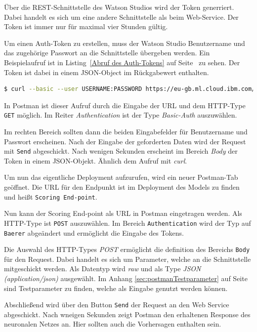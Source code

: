 Über die REST-Schnittstelle des Watson Studios wird der Token generriert. Dabei handelt es sich um eine andere
Schnittstelle als beim Web-Service. Der Token ist immer nur für maximal vier Stunden gültig.

Um einen Auth-Token zu erstellen, muss der Watson Studio Benutzername und das zugehörige Passwort an die Schnittstelle
übergeben werden. Ein Beispielaufruf ist in Listing~\ref{Abruf des Auth-Tokens} auf Seite~\pageref{Abruf des Auth-Tokens}
zu sehen. Der Token ist dabei in einem JSON-Object im Rückgabewert enthalten.

\begin{lstlisting}[language=bash, caption=Abruf des Auth-Tokens, label=Abruf des Auth-Tokens]
$ curl --basic --user USERNAME:PASSWORD https://eu-gb.ml.cloud.ibm.com/v3/identity/token
\end{lstlisting}

In Postman ist dieser Aufruf durch die Eingabe der URL und dem HTTP-Type \texttt{GET} möglich. Im Reiter
\textit{Authentication} ist der Type \textit{Basic-Auth} auszuwählen.

Im rechten Bereich sollten dann die beiden Eingabefelder für Benutzername und Passwort erscheinen. Nach der Eingabe der
geforderten Daten wird der Request mit \texttt{Send} abgeschickt. Nach wenigen Sekunden erscheint im Bereich
\textit{Body} der Token in einem JSON-Objekt. Ähnlich dem Aufruf mit \textit{curl}.

Um nun das eigentliche Deployment aufzurufen, wird ein neuer Postman-Tab geöffnet. Die URL für den Endpunkt ist im
Deployment des Models zu finden und heißt \texttt{Scoring End-point}.

Nun kann der Scoring End-point als URL in Postman eingetragen werden. Als HTTP-Type ist \texttt{POST} auszuwählen.
Im Bereich \texttt{Authentication} wird der Typ auf \texttt{Baerer} abgeändert und ermöglicht die Eingabe des Tokens.

Die Auswahl des HTTP-Types \textit{POST} ermöglicht die definition des Bereichs \texttt{Body} für den Request. Dabei
handelt es sich um Parameter, welche an die Schnittstelle mitgeschickt werden. Als Datentyp wird \textit{raw} und als
Type \textit{JSON (application/json)} ausgewählt. Im Anhang \ref{sec:postmanTestparameter} auf Seite
\pageref{sec:postmanTestparameter} sind Testparameter zu finden, welche als Eingabe genutzt werden können.

Abschließend wird über den Button \texttt{Send} der Request an den Web Service abgeschickt. Nach wneigen Sekunden zeigt
Postman den erhaltenen Response des neuronalen Netzes an. Hier sollten auch die Vorhersagen enthalten sein.


